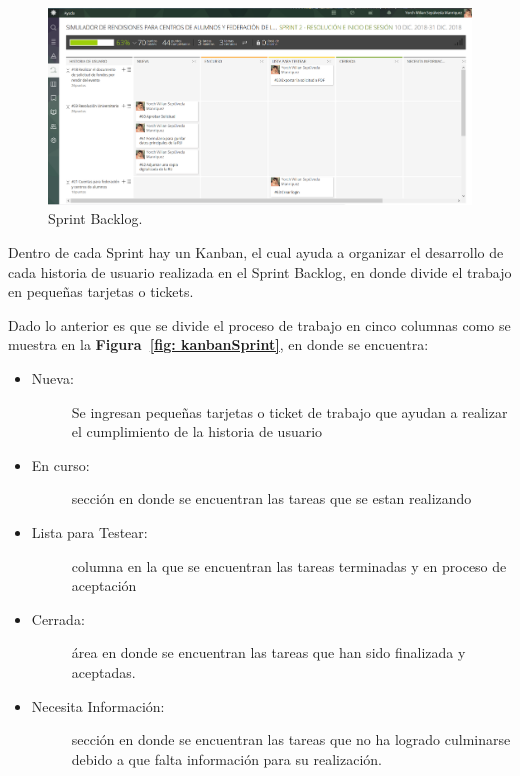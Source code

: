 \begin{figure}[h!]
    \includegraphics[width=\textwidth]{Imagenes/Kanban.png}
    \caption{\label{fig: SprintBacklog} Sprint Backlog.}
\end{figure}

Dentro de cada Sprint hay un Kanban, el cual ayuda a organizar el desarrollo de cada historia de usuario realizada en el Sprint Backlog, en donde divide el trabajo en pequeñas tarjetas o tickets.

Dado lo anterior es que se divide el proceso de trabajo en cinco columnas como se muestra en la \textbf{Figura~\ref{fig: kanbanSprint}}, en donde se encuentra:

\begin{itemize}
    \item   \begin{description}
                \item[Nueva:] Se ingresan pequeñas tarjetas o ticket de trabajo que ayudan a realizar el cumplimiento de la historia de usuario 
            \end{description}

    \item   \begin{description}
                \item[En curso:] sección en donde se encuentran las tareas que se estan realizando
            \end{description}

    \item   \begin{description}
                \item[Lista para Testear:] columna en la que se encuentran las tareas terminadas y en proceso de aceptación
            \end{description}

    \item   \begin{description}
                \item[Cerrada:] área en donde se encuentran las tareas que han sido finalizada y aceptadas.
            \end{description}
    
    \item   \begin{description}
                \item[Necesita Información:] sección en donde se encuentran las tareas que no ha logrado culminarse debido a que falta información para su realización.
            \end{description}
\end{itemize}

